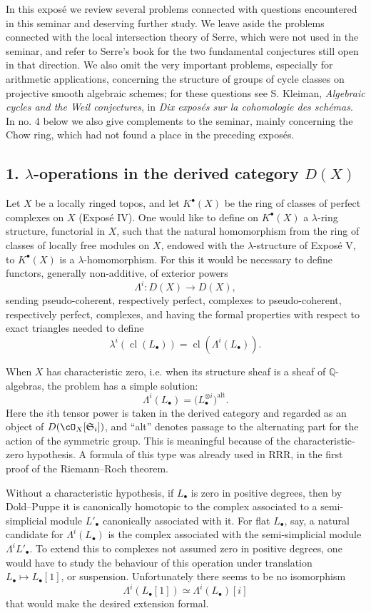 \documentclass[11pt]{article}
\theoremstyle{plain}
\theoremstyle{definition}
\theoremstyle{remark}
\newcommand{\QQ}{\mathbb Q}
\DeclareMathOperator{\cl}{cl}
\newcommand{\longto}{\longrightarrow}
\begin{document}
In this exposé we review several problems connected with questions encountered in this seminar and deserving further study. We leave aside the problems connected with the local intersection theory of Serre, which were not used in the seminar, and refer to Serre's book for the two fundamental conjectures still open in that direction. We also omit the very important problems, especially for arithmetic applications, concerning the structure of groups of cycle classes on projective smooth algebraic schemes; for these questions see S. Kleiman, \emph{Algebraic cycles and the Weil conjectures}, in \emph{Dix exposés sur la cohomologie des schémas}. In no. 4 below we also give complements to the seminar, mainly concerning the Chow ring, which had not found a place in the preceding exposés.

\subsection*{1. $\lambda$-operations in the derived category $D(X)$}

Let $X$ be a locally ringed topos, and let $K^\bullet(X)$ be the ring of classes of perfect complexes on $X$ (Exposé IV). One would like to define on $K^\bullet(X)$ a $\lambda$-ring structure, functorial in $X$, such that the natural homomorphism from the ring of classes of locally free modules on $X$, endowed with the $\lambda$-structure of Exposé V, to $K^\bullet(X)$ is a $\lambda$-homomorphism. For this it would be necessary to define functors, generally non-additive, of exterior powers
\[
\Lambda^i:D(X)\longto D(X),
\]
sending pseudo-coherent, respectively perfect, complexes to pseudo-coherent, respectively perfect, complexes, and having the formal properties with respect to exact triangles needed to define
\[
\lambda^i(\cl(L_\bullet))=\cl(\Lambda^i(L_\bullet)).
\tag{1.1}
\]

When $X$ has characteristic zero, i.e. when its structure sheaf is a sheaf of $\QQ$-algebras, the problem has a simple solution:
\[
\Lambda^i(L_\bullet)=\bigl(L_\bullet^{\otimes i}\bigr)^{\mathrm{alt}}.
\tag{1.2}
\]
Here the $i$th tensor power is taken in the derived category and regarded as an object of $D(\cO_X[\mathfrak S_i])$, and ``alt'' denotes passage to the alternating part for the action of the symmetric group. This is meaningful because of the characteristic-zero hypothesis. A formula of this type was already used in RRR, in the first proof of the Riemann--Roch theorem.

Without a characteristic hypothesis, if $L_\bullet$ is zero in positive degrees, then by Dold--Puppe it is canonically homotopic to the complex associated to a semi-simplicial module $L'_\bullet$ canonically associated with it. For flat $L_\bullet$, say, a natural candidate for $\Lambda^i(L_\bullet)$ is the complex associated with the semi-simplicial module $\Lambda^iL'_\bullet$. To extend this to complexes not assumed zero in positive degrees, one would have to study the behaviour of this operation under translation $L_\bullet\mapsto L_\bullet[1]$, or suspension. Unfortunately there seems to be no isomorphism
\[
\Lambda^i(L_\bullet[1])\simeq \Lambda^i(L_\bullet)[i]
\]
that would make the desired extension formal.
\end{document}
